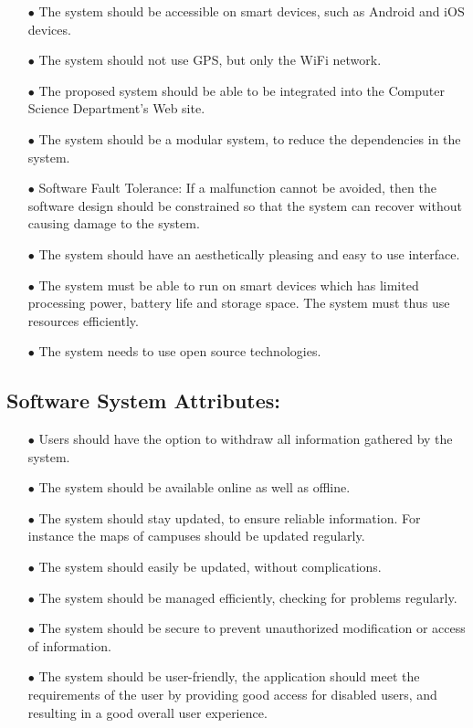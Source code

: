 \documentclass[english]{article}
\begin{document}
\begin{itemize}
\item[$\bullet$]The system should be accessible on smart devices, such as Android and iOS devices.
\item[$\bullet$] The system should not use GPS, but only the WiFi network.
\item[$\bullet$] The proposed system should be able to be integrated into the Computer Science Department's Web site.
\item[$\bullet$]The system should be a modular system, to reduce the dependencies in the system.
\item[$\bullet$]Software Fault Tolerance: If a malfunction cannot be avoided, then the software design should be constrained so that the system can recover without causing damage to the system.
\item[$\bullet$]The system should have an aesthetically pleasing and easy to use interface.
\item[$\bullet$]The system must be able to run on smart devices which has limited processing power, battery life and storage space. The system must thus use resources efficiently. 
\item[$\bullet$]The system needs to use open source technologies.
\end{itemize}	

\subsection{Software System Attributes:}

\begin{itemize}
\item[$\bullet$]Users should have the option to withdraw all information gathered by the system.

\item[$\bullet$]The system should be available online as well as offline.

\item[$\bullet$]The system should stay updated, to ensure reliable information. For instance the maps of campuses should be updated regularly.

\item[$\bullet$]The system should easily be updated, without complications.

\item[$\bullet$]The system should be managed efficiently, checking for problems regularly.

\item[$\bullet$]The system should be secure to prevent unauthorized modification or access of information.

\item[$\bullet$]The system should be user-friendly, the application should meet the requirements of the user by providing good access for disabled users, and resulting in a good overall user experience.
\end{itemize}	
	
\end{document}

